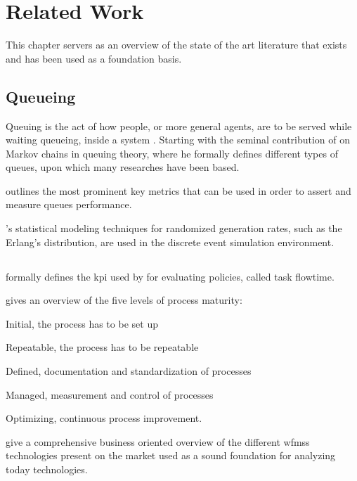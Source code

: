\chapter{Related Work}
\label{ch:related_work}

This chapter servers as an overview of the state of the art literature that exists and has been used as a foundation basis.

\section{Queueing}
\label{sec:queueing}

Queuing is the act of how people, or more general agents, are to be served while waiting \ie queueing, inside a system \citep{Kendall1953}. Starting with the seminal contribution of \citet{Kendall1953} on Markov chains in queuing theory, where he formally defines different types of queues, upon which many researches have been based.

\citet{Pinedo2008} outlines the most prominent key metrics that can be used in order to assert and measure queues performance.

\citet{Adan2015}'s statistical modeling techniques for randomized generation rates, such as the Erlang's distribution, are used in the discrete event simulation environment.

\section{}
\label{sec:workflow}

\citet{Baker1974} formally defines the \gls{kpi} used by \citet{Zeng2005} for evaluating policies, called task flowtime.

\citet{Macintosh1993} gives an overview of the five levels of process maturity:
\begin{enumerate*}
	\item Initial, the process has to be set up
	\item Repeatable, the process has to be repeatable
	\item Defined, documentation and standardization of processes
	\item Managed, measurement and control of processes
	\item Optimizing, continuous process improvement.
\end{enumerate*}

\citet{Georgakopoulos1995} give a comprehensive business oriented overview of the different \glspl{wfms} technologies present on the market used as a sound foundation for analyzing today technologies.

